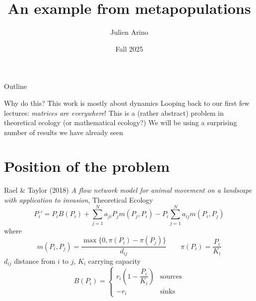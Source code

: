 \documentclass[aspectratio=169]{beamer}
\title{An example from metapopulations}
\author{Julien Arino}
\date{Fall 2025}
\begin{document}
\begin{frame}
	\titlepage
\end{frame}
\addtocounter{page}{-1}
  
  
\begin{frame}{Outline}
	  \tableofcontents[hideallsubsections]
\end{frame}
\addtocounter{page}{-1}


\begin{frame}{Why do this?}
	This work is mostly about dynamics
	\vfill
	Looping back to our first few lectures: \emph{matrices are everywhere}!
	\vfill
	This is a (rather abstract) problem in theoretical ecology (or mathematical ecology?)
	\vfill
	We will be using a surprising number of results we have already seen
\end{frame}

\section{Position of the problem}
\begin{frame}{Rael \& Taylor (2018)}
	{\footnotesize\emph{A flow network model for animal movement on a landscape with application to invasion}, Theoretical Ecology}
	\vfill
	\[
	P_i' = P_iB(P_i)+\sum_{j=1}^N 
	a_{ji}P_jm(P_j,P_i)
	-P_i\sum_{j=1}^N a_{ij}m(P_i,P_j)
	\]
	where
	\[
	m(P_i, P_j) = \frac{\max\{0, \pi(P_i)-\pi(P_j)\}}{d_{ij}}
	\qquad \pi(P_i) = \frac{P_i}{K_i}
	\]
	$d_{ij}$ distance from $i$ to $j$, $K_i$ carrying capacity
	\[
	B(P_i) = \begin{cases}
	r_i\left(1-\dfrac{P_i}{K_i}\right) & \textrm{sources} \\
	-r_i & \textrm{sinks}
	\end{cases}
	\]
\end{frame}
	
\end{document}
